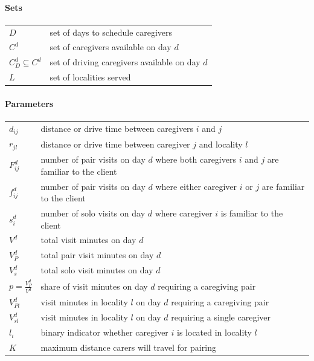 \documentclass[11pt,twoside]{article}
\numberwithin{Theorem}{section}
\numberwithin{Definition}{section}
\numberwithin{Lemma}{section}
\numberwithin{Algorithm}{section}
\numberwithin{equation}{section}
\newenvironment{modelsets}{
\paragraph{Sets}\mbox{}
\begin{table}[H]
\begin{tabular}{ll}
}{
\end{tabular}
\end{table}
}
\newenvironment{modelparams}{
\paragraph{Parameters}\mbox{}
\begin{table}[H]
\begin{tabular}{ll}
}{
\end{tabular}
\end{table}
}
\begin{document}
\pagestyle{empty}


\begin{modelsets}
	$D$ & set of days to schedule caregivers\\
	$C^d$ & set of caregivers available on day $d$\\
	$C_D^d \subseteq C^d$ & set of driving caregivers available on day $d$\\
	$L$ & set of localities served
\end{modelsets}

\begin{modelparams}
	$d_{ij}$ & \quad distance or drive time between caregivers $i$ and $j$\\
	$r_{jl}$ & \quad distance or drive time between caregiver $j$ and locality $l$\\
	$F_{ij}^d$ & \quad number of pair visits on day $d$ where both caregivers $i$ and $j$ are familiar to the client\\
	$f_{ij}^d$ & \quad number of pair visits on day $d$ where either caregiver $i$ or $j$ are familiar to the client\\
	$s_i^d$ & \quad number of solo visits on day $d$ where caregiver $i$ is familiar to the client\\
	$V^d$ & \quad total visit minutes on day $d$\\
	$V_P^d$ & \quad total pair visit minutes on day $d$\\
	$V_s^d$ & \quad total solo visit minutes on day $d$\\
	$p = \frac{V_P^d}{V^d}$ & \quad share of visit minutes on day $d$ requiring a caregiving pair\\
	$V_{Pl}^d$ & \quad visit minutes in locality $l$ on day $d$ requiring a caregiving pair\\
	$V_{sl}^d$ & \quad visit minutes in locality $l$ on day $d$ requiring a single caregiver\\
	$l_i$ & \quad binary indicator whether caregiver $i$ is located in locality $l$\\
	$K$ & \quad maximum distance carers will travel for pairing
\end{modelparams}
\end{document}
